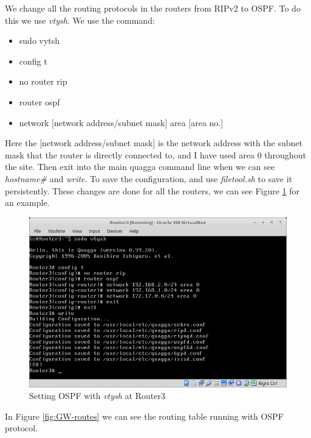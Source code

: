 \documentclass{article}
\begin{document}
We change all the routing protocols in the routers from RIPv2 to OSPF. To do this we use \textit{vtysh}. We use the command:\\
\begin{itemize}
    \item sudo vytsh 
    \item config t
    \item no router rip
    \item router ospf
    \item network [network address/subnet mask] area [area no.]
\end{itemize}
Here the [network address/subnet mask] is the network address with the subnet mask that the router is directly connected to, and I have used area 0 throughout the site. Then exit into the main quagga command line when we can see \textit{hostname\#} 
and \textit{write}. To save the configuration, and use \textit{filetool.sh} to save it persistently. These changes are done for all the routers, we can see Figure \ref{fig:router3-ospf} for an example.

\begin{figure}[!h]
    \centering
    \includegraphics[scale=0.3]{router3-ospf-vtysh}
    \caption{Setting OSPF with \textit{vtysh} at Router3}
    \label{fig:router3-ospf}
\end{figure}


In Figure \ref{fig:GW-routes} we can see the routing table running with OSPF protocol.
\end{document}
